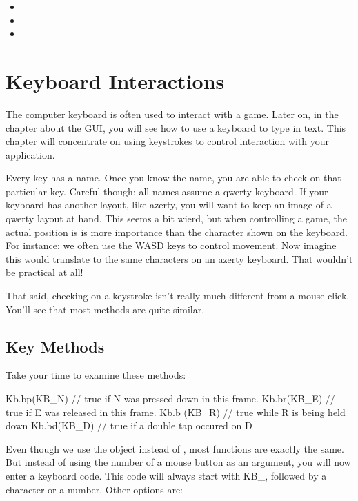 \begin{itemize}
	\item {}
	\item {}
	\item {}
\end{itemize}

\section{Keyboard Interactions}
The computer keyboard is often used to interact with a game. Later on, in the chapter about the GUI, you will see how to use a keyboard to type in text. This chapter will concentrate on using keystrokes to control interaction with your application.

Every key has a name. Once you know the name, you are able to check on that particular key. Careful though: all names assume a qwerty keyboard. If your keyboard has another layout, like azerty, you will want to keep an image of a qwerty layout at hand. This seems a bit wierd, but when controlling a game, the actual position is is more importance than the character shown on the keyboard. For instance: we often use the WASD keys to control movement. Now imagine this would translate to the same characters on an azerty keyboard. That wouldn't be practical at all!

That said, checking on a keystroke isn't really much different from a mouse click. You'll see that most methods are quite similar.

\subsection{Key Methods}

Take your time to examine these methods:

\begin{code}
Kb.bp(KB_N) // true if N was pressed down in this frame.
Kb.br(KB_E) // true if E was released in this frame.
Kb.b (KB_R) // true while R is being held down
Kb.bd(KB_D) // true if a double tap occured on D
\end{code}

Even though we use the object  instead of , most functions are exactly the same.  But instead of using the number of a mouse button as an argument, you will now enter a keyboard code. This code will always start with KB\_, followed by a character or a number. Other options are:

